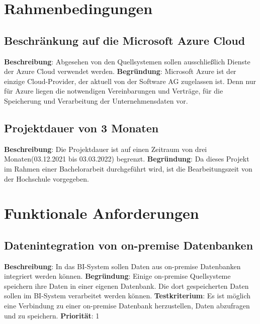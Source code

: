 \section{Rahmenbedingungen} 

\subsection{Beschränkung auf die Microsoft Azure Cloud} \label{sec:anforderungsspezifikation:azureCloud}
\textbf{Beschreibung}: Abgesehen von den Quellsystemen sollen ausschließlich Dienste der Azure Cloud verwendet werden.
\newline \textbf{Begründung}: Microsoft Azure ist der einzige Cloud-Provider, der aktuell von der Software AG zugelassen ist. Denn nur für Azure liegen die notwendigen Vereinbarungen und Verträge, für die Speicherung und Verarbeitung der Unternehmensdaten vor.

\subsection{Projektdauer von 3 Monaten} \label{sec:anforderungsspezifikation:projektDauer}
\textbf{Beschreibung}: Die Projektdauer ist auf einen Zeitraum von drei Monaten(03.12.2021 bis 03.03.2022) begrenzt.
\newline \textbf{Begründung}: Da dieses Projekt im Rahmen einer Bachelorarbeit durchgeführt wird, ist die Bearbeitungszeit von der Hochschule vorgegeben.

\section{Funktionale Anforderungen} \label{sec:anforderungsspezifikation:funktionaleAnforderungen}

\subsection{Datenintegration von on-premise Datenbanken} \label{sec:anforderungsspezifikation:datenintegrationOnPremDB}
\textbf{Beschreibung}: In das BI-System sollen Daten aus on-premise Datenbanken integriert werden können.
\newline \textbf{Begründung}: Einige on-premise Quellsysteme speichern ihre Daten in einer eigenen Datenbank. Die dort gespeicherten Daten sollen im BI-System verarbeitet werden können.
\newline \textbf{Testkriterium}: Es ist möglich eine Verbindung zu einer on-premise Datenbank herzustellen, Daten abzufragen und zu speichern.
\newline \textbf{Priorität}: 1

